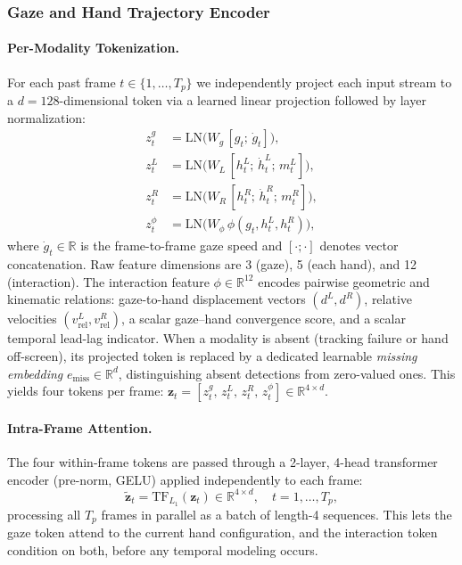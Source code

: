 \subsubsection{Gaze and Hand Trajectory Encoder}
\label{sec:traj_enc}

\paragraph{Per-Modality Tokenization.}
For each past frame $t \in \{1,\ldots,T_p\}$ we independently project each input
stream to a $d{=}128$-dimensional token via a learned linear projection followed by
layer normalization:
\begin{align}
    z_t^{g}    &= \mathrm{LN}\!\bigl(W_g\,[g_t;\,\dot{g}_t]\bigr),             \label{eq:tok_gaze} \\
    z_t^{L}    &= \mathrm{LN}\!\bigl(W_L\,[h_t^L;\,\dot{h}_t^L;\,m_t^L]\bigr), \label{eq:tok_left} \\
    z_t^{R}    &= \mathrm{LN}\!\bigl(W_R\,[h_t^R;\,\dot{h}_t^R;\,m_t^R]\bigr), \label{eq:tok_right}\\
    z_t^{\phi} &= \mathrm{LN}\!\bigl(W_\phi\,\phi(g_t, h_t^L, h_t^R)\bigr),    \label{eq:tok_int}
\end{align}
where $\dot{g}_t \in \mathbb{R}$ is the frame-to-frame gaze speed and
$[\cdot;\cdot]$ denotes vector concatenation.
Raw feature dimensions are 3 (gaze), 5 (each hand), and 12 (interaction).
The interaction feature $\phi \in \mathbb{R}^{12}$ encodes pairwise geometric and
kinematic relations: gaze-to-hand displacement vectors $(d^L, d^R)$, relative velocities
$(v_{\mathrm{rel}}^L, v_{\mathrm{rel}}^R)$, a scalar gaze--hand convergence score,
and a scalar temporal lead-lag indicator.
When a modality is absent (tracking failure or hand off-screen), its projected token is
replaced by a dedicated learnable \emph{missing embedding} $e_{\mathrm{miss}} \in \mathbb{R}^d$,
distinguishing absent detections from zero-valued ones.
This yields four tokens per frame:
$\mathbf{z}_t = [z_t^g,\, z_t^L,\, z_t^R,\, z_t^\phi] \in \mathbb{R}^{4 \times d}$.

\paragraph{Intra-Frame Attention.}
The four within-frame tokens are passed through a 2-layer, 4-head transformer encoder
(pre-norm, GELU) applied independently to each frame:
\begin{equation}
    \tilde{\mathbf{z}}_t = \mathrm{TF}_{L_1}(\mathbf{z}_t) \in \mathbb{R}^{4 \times d},
    \quad t = 1,\ldots,T_p,
\end{equation}
processing all $T_p$ frames in parallel as a batch of length-4 sequences.
This lets the gaze token attend to the current hand configuration,
and the interaction token condition on both, before any temporal modeling occurs.

